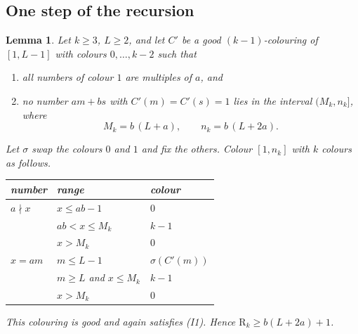 \documentclass[11pt,a4paper]{article}
\newtheorem{lemma}[theorem]{Lemma}
\theoremstyle{definition}
\theoremstyle{remark}
\newcommand{\R}{\mathrm{R}}
\begin{document}
\subsection{One step of the recursion}
\begin{lemma}\label{lem:step}
Let $k\ge3$, $L\ge2$, and let $C'$ be a good $(k-1)$-colouring of $[1,L-1]$ with colours $0,\dots,k-2$ such that
\begin{enumerate}[label=(I\arabic*)]
\item all numbers of colour $1$ are multiples of $a$, and
\item no number $am+bs$ with $C'(m)=C'(s)=1$ lies in the interval $(M_k,n_k]$, where
\[
  M_k=b\,(L+a),\qquad n_k=b\,(L+2a).
\]
\end{enumerate}
Let $\sigma$ swap the colours $0$ and $1$ and fix the others. Colour $[1,n_k]$ with $k$ colours as follows.
\begin{center}
\renewcommand{\arraystretch}{1.15}
\begin{tabular}{lll}
\toprule
number & range & colour\\
\midrule
$a\nmid x$ & $x\le ab-1$ & $0$\\
 & $ab<x\le M_k$ & $k-1$\\
 & $x>M_k$ & $0$\\
\midrule
$x=am$ & $m\le L-1$ & $\sigma(C'(m))$\\
 & $m\ge L$ and $x\le M_k$ & $k-1$\\
 & $x>M_k$ & $0$\\
\bottomrule
\end{tabular}
\end{center}
This colouring is good and again satisfies (I1). Hence $\R_k\ge b(L+2a)+1$.
\end{lemma}
\end{document}
